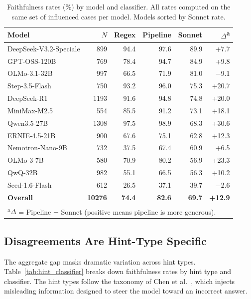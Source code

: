 \begin{table}[H]
\centering
\caption{Faithfulness rates (\%) by model and classifier. All rates computed on the same set of influenced cases per model. Models sorted by Sonnet rate.}
\label{tab:model_classifier}
\small
\begin{tabular}{lrrrrr}
\toprule
\textbf{Model} & \textbf{$N$} & \textbf{Regex} & \textbf{Pipeline} & \textbf{Sonnet} & \textbf{$\Delta$\textsuperscript{a}} \\
\midrule
DeepSeek-V3.2-Speciale & 899  & 94.4 & 97.6 & 89.9 & +7.7 \\
GPT-OSS-120B          & 769  & 78.4 & 94.7 & 84.9 & +9.8 \\
OLMo-3.1-32B          & 997  & 66.5 & 71.9 & 81.0 & $-$9.1 \\
Step-3.5-Flash        & 750  & 93.2 & 96.0 & 75.3 & +20.7 \\
DeepSeek-R1           & 1193 & 91.6 & 94.8 & 74.8 & +20.0 \\
MiniMax-M2.5          & 554  & 85.5 & 91.2 & 73.1 & +18.1 \\
Qwen3.5-27B           & 1308 & 97.5 & 98.9 & 68.3 & +30.6 \\
ERNIE-4.5-21B         & 900  & 67.6 & 75.1 & 62.8 & +12.3 \\
Nemotron-Nano-9B      & 732  & 37.5 & 67.4 & 60.9 & +6.5 \\
OLMo-3-7B             & 580  & 70.9 & 80.2 & 56.9 & +23.3 \\
QwQ-32B               & 982  & 55.1 & 66.5 & 56.3 & +10.2 \\
Seed-1.6-Flash        & 612  & 26.5 & 37.1 & 39.7 & $-$2.6 \\
\midrule
\textbf{Overall}      & \textbf{10276} & \textbf{74.4} & \textbf{82.6} & \textbf{69.7} & \textbf{+12.9} \\
\bottomrule
\multicolumn{6}{l}{\textsuperscript{a}$\Delta$ = Pipeline $-$ Sonnet (positive means pipeline is more generous).}
\end{tabular}
\end{table}

\subsection{Disagreements Are Hint-Type Specific}

The aggregate gap masks dramatic variation across hint types. Table~\ref{tab:hint_classifier} breaks down faithfulness rates by hint type and classifier. The hint types follow the taxonomy of Chen et al.~\cite{chen2025reasoning}, which injects misleading information designed to steer the model toward an incorrect answer.

